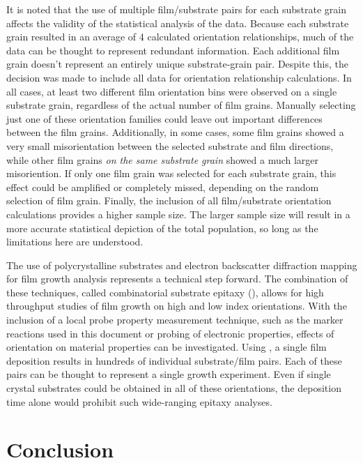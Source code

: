 It is noted that the use of multiple film/substrate pairs for each substrate grain affects
the validity of the statistical analysis of the data. Because each substrate grain
resulted in an average of \texttildelow{}4 calculated orientation relationships, much of
the data can be thought to represent redundant information. Each additional film grain
doesn't represent an entirely unique substrate-grain pair. Despite this, the decision was
made to include all data for orientation relationship calculations. In all cases, at least
two different film orientation bins were observed on a single substrate grain, regardless
of the actual number of film grains. Manually selecting just one of these orientation
families could leave out important differences between the film grains. Additionally, in
some cases, some film grains showed a very small misorientation between the selected
substrate and film directions, while other film grains \emph{on the same substrate grain}
showed a much larger misoriention. If only one film grain was selected for each substrate
grain, this effect could be amplified or completely missed, depending on the random
selection of film grain. Finally, the inclusion of all film/substrate orientation
calculations provides a higher sample size. The larger sample size will result in a more
accurate statistical depiction of the total population, so long as the limitations here
are understood.

The use of polycrystalline substrates and electron backscatter diffraction mapping for
film growth analysis represents a technical step forward. The combination of these
techniques, called combinatorial substrate epitaxy (), allows for high
throughput studies of film growth on high and low index orientations. With the inclusion
of a local probe property measurement technique, such as the marker reactions used in this
document or  probing of electronic properties, effects of orientation on
material properties can be investigated. Using , a single film deposition
results in hundreds of individual substrate/film pairs. Each of these pairs can be thought
to represent a single growth experiment. Even if single crystal substrates could be
obtained in all of these orientations, the deposition time alone would prohibit such
wide-ranging epitaxy analyses.


\section{Conclusion}
\label{sec:poly.growth.conclusion}

